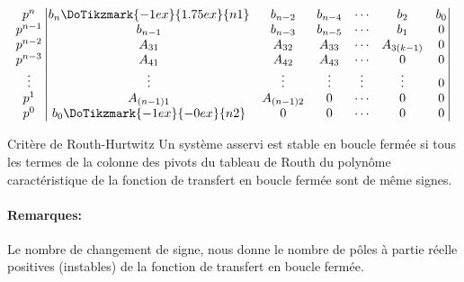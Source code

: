 \[
\begin{matrix}
    p^n    \\
    p^{n-1}\\
    p^{n-2}\\
    p^{n-3}\\
    \vdots \\
    p^1    \\
    p^0    \\
\end{matrix}
\begin{vmatrix}
    b_n\DoTikzmark{-1ex}{1.75ex}{n1} & b_{n-2} & b_{n-4}& \cdots & b_2  & b_0\\
    b_{n-1}              & b_{n-3}   & b_{n-5} & \cdots & b_1      & 0 \\
    A_{31}               & A_{32}    & A_{33}  & \cdots & A_{3(k-1)} & 0 \\
    A_{41}               & A_{42}    & A_{43}  & \cdots & 0        & 0 \\
    \vdots               & \vdots    & \vdots  & \vdots & \vdots   & 0 \\
    A_{(n-1)1}           & A_{(n-1)2}& 0       & \cdots & 0        & 0 \\
    b_0\DoTikzmark{-1ex}{-0ex}{n2}    & 0       & 0      & \cdots & 0 & 0
\end{vmatrix}
\]
\begin{criteria}{Critère de Routh-Hurtwitz}
    Un système asservi est stable en boucle fermée
    si tous les termes de la colonne des pivots 
    du tableau de Routh du polynôme caractéristique 
    de la fonction de transfert en boucle fermée sont de même signes.
\end{criteria}
\paragraph{Remarques:}
Le nombre de changement de signe, nous donne le nombre de pôles à partie 
réelle positives (instables) de la fonction de transfert en boucle fermée.
